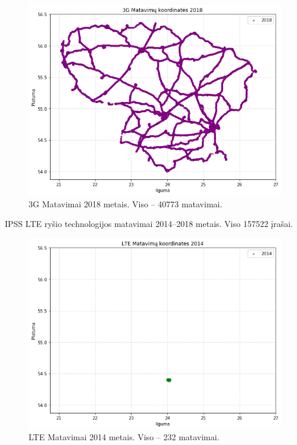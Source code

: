 \documentclass{VUMIFPSbakalaurinis}
\begin{document}
\begin{figure}[H]
	\centering
	\includegraphics[scale=0.33]{img/3G-5}
	\caption{3G Matavimai 2018 metais. Viso – 40773 matavimai.}
	\label{img:3G-5}
\end{figure}
IPSS LTE ryšio technologijos matavimai 2014–2018 metais. Viso 157522 įrašai.
\begin{figure}[H]
	\centering
	\includegraphics[scale=0.33]{img/LTE-1}
	\caption{LTE Matavimai 2014 metais. Viso – 232 matavimai.}
	\label{img:LTE-1}
\end{figure}
\end{document}
